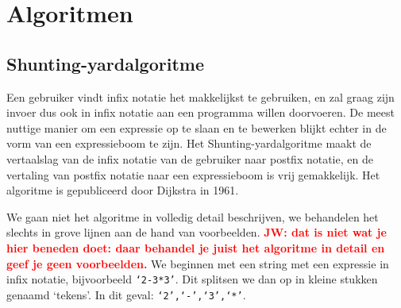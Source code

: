 \documentclass[a4paper]{article}
\newcommand{\rcom}[1]{\textbf{\textcolor{red}{#1}}}
\begin{document}
\section{Algoritmen}
\subsection{Shunting-yardalgoritme}
Een gebruiker vindt infix notatie het makkelijkst te gebruiken, en zal graag zijn invoer dus ook in infix notatie aan een programma willen doorvoeren. De meest nuttige manier om een expressie op te slaan en te bewerken blijkt echter in de vorm van een expressieboom te zijn. Het Shunting-yardalgoritme maakt de vertaalslag van de infix notatie van de gebruiker naar postfix notatie, en de vertaling van postfix notatie naar een expressieboom is vrij gemakkelijk. Het algoritme is gepubliceerd door Dijkstra in 1961. 

We gaan niet het algoritme in volledig detail beschrijven, we behandelen het slechts in grove lijnen aan de hand van voorbeelden. \rcom{JW: dat is niet wat je hier beneden doet: daar behandel je juist het algoritme in detail en geef je geen voorbeelden.} We beginnen met een string met een expressie in infix notatie, bijvoorbeeld \texttt{`2-3*3'}. Dit splitsen we dan op in kleine stukken genaamd `tekens'. In dit geval: \texttt{`2',`-',`3',`*'}. 
\end{document}
